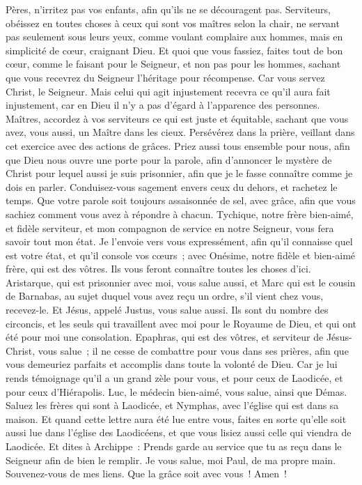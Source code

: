 \begin{multicols}{2}
Pères, n'irritez pas vos enfants, afin qu'ils ne se découragent pas.
Serviteurs, obéissez en toutes choses à ceux qui sont vos maîtres selon la chair, ne servant pas seulement sous leurs yeux, comme voulant complaire aux hommes, mais en simplicité de cœur, craignant Dieu.
Et quoi que vous fassiez, faites tout de bon cœur, comme le faisant pour le Seigneur, et non pas pour les hommes,
sachant que vous recevrez du Seigneur l'héritage pour récompense. Car vous servez Christ, le Seigneur.
Mais celui qui agit injustement recevra ce qu'il aura fait injustement, car en Dieu il n'y a pas d'égard à l'apparence des personnes.
\VerseOne{}Maîtres, accordez à vos serviteurs ce qui est juste et équitable, sachant que vous avez, vous aussi, un Maître dans les cieux.
Persévérez dans la prière, veillant dans cet exercice avec des actions de grâces.
Priez aussi tous ensemble pour nous, afin que Dieu nous ouvre une porte pour la parole, afin d'annoncer le mystère de Christ pour lequel aussi je suis prisonnier,
afin que je le fasse connaître comme je dois en parler.
Conduisez-vous sagement envers ceux du dehors, et rachetez le temps.
Que votre parole soit toujours assaisonnée de sel, avec grâce, afin que vous sachiez comment vous avez à répondre à chacun.
Tychique, notre frère bien-aimé, et fidèle serviteur, et mon compagnon de service en notre Seigneur, vous fera savoir tout mon état.
Je l'envoie vers vous expressément, afin qu'il connaisse quel est votre état, et qu'il console vos cœurs~;
avec Onésime, notre fidèle et bien-aimé frère, qui est des vôtres. Ils vous feront connaître toutes les choses d'ici.
Aristarque, qui est prisonnier avec moi, vous salue aussi, et Marc qui est le cousin de Barnabas, au sujet duquel vous avez reçu un ordre, s'il vient chez vous, recevez-le.
Et Jésus, appelé Justus, vous salue aussi. Ils sont du nombre des circoncis, et les seuls qui travaillent avec moi pour le Royaume de Dieu, et qui ont été pour moi une consolation.
Epaphras, qui est des vôtres, et serviteur de Jésus-Christ, vous salue~; il ne cesse de combattre pour vous dans ses prières, afin que vous demeuriez parfaits et accomplis dans toute la volonté de Dieu.
Car je lui rends témoignage qu'il a un grand zèle pour vous, et pour ceux de Laodicée, et pour ceux d'Hiérapolis.
Luc, le médecin bien-aimé, vous salue, ainsi que Démas.
Saluez les frères qui sont à Laodicée, et Nymphas, avec l'église qui est dans sa maison.
Et quand cette lettre aura été lue entre vous, faites en sorte qu'elle soit aussi lue dans l'église des Laodicéens, et que vous lisiez aussi celle qui viendra de Laodicée.
Et dites à Archippe~: Prends garde au service que tu as reçu dans le Seigneur afin de bien le remplir.
Je vous salue, moi Paul, de ma propre main. Souvenez-vous de mes liens. Que la grâce soit avec vous~! Amen~!
\PPE{}
\end{multicols}
